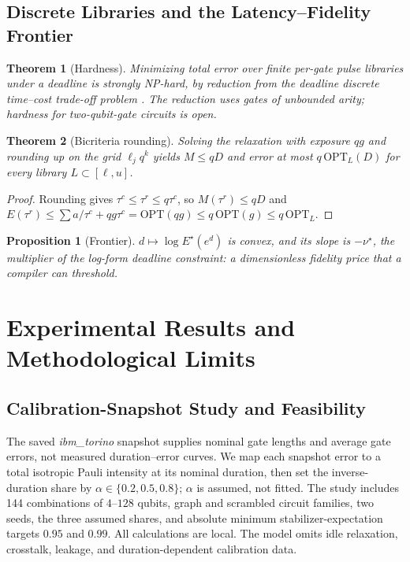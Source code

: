 \documentclass[10pt,letterpaper,journal]{IEEEtran}
\newtheorem{theorem}{Theorem}
\newtheorem{proposition}{Proposition}
\begin{document}
\subsection{Discrete Libraries and the Latency--Fidelity Frontier}
\begin{theorem}[Hardness]\label{th:hard}
Minimizing total error over finite per-gate pulse libraries under a deadline is strongly NP-hard, by reduction from the deadline discrete time--cost trade-off problem \cite{de1997}. The reduction uses gates of unbounded arity; hardness for two-qubit-gate circuits is open.
\end{theorem}
\begin{theorem}[Bicriteria rounding]\label{th:bicriteria}
Solving the relaxation with exposure $qg$ and rounding up on the grid $\ell_jq^k$ yields $M\le qD$ and error at most $q\,\mathrm{OPT}_L(D)$ for every library $L\subset[\ell,u]$.
\end{theorem}
\begin{proof}
Rounding gives $\tau^c\le\tau^r\le q\tau^c$, so $M(\tau^r)\le qD$ and $E(\tau^r)\le\sum a/\tau^c+qg\tau^c=\mathrm{OPT}(qg)\le q\,\mathrm{OPT}(g)\le q\,\mathrm{OPT}_L$.
\end{proof}
\begin{proposition}[Frontier]\label{prop:frontier}
$d\mapsto\log E^\star(e^d)$ is convex, and its slope is $-\nu^\star$, the multiplier of the log-form deadline constraint: a dimensionless fidelity price that a compiler can threshold.
\end{proposition}

\section{Experimental Results and Methodological Limits}

\subsection{Calibration-Snapshot Study and Feasibility}
The saved \emph{ibm\_torino} snapshot supplies nominal gate lengths and average gate errors, not measured duration--error curves. We map each snapshot error to a total isotropic Pauli intensity at its nominal duration, then set the inverse-duration share by $\alpha\in\{0.2,0.5,0.8\}$; $\alpha$ is assumed, not fitted. The study includes 144 combinations of $4$--$128$ qubits, graph and scrambled circuit families, two seeds, the three assumed shares, and absolute minimum stabilizer-expectation targets $0.95$ and $0.99$. All calculations are local. The model omits idle relaxation, crosstalk, leakage, and duration-dependent calibration data.
\end{document}
